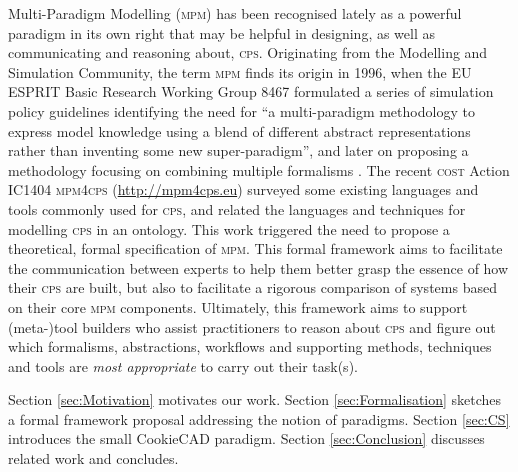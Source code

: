 Multi-Paradigm Modelling (\textsc{mpm}) has been recognised lately as a powerful
paradigm in its own right that may be helpful in designing, as well as
communicating and reasoning about, \textsc{cps}. Originating
from the Modelling and Simulation Community, the term \textsc{mpm} finds its origin
in 1996, when the EU ESPRIT Basic Research Working Group 8467 formulated a series of simulation
policy guidelines \cite{Vangheluwe-VansteenkisteKerckhoffs-1996} identifying the
need for ``a multi-paradigm methodology to express model knowledge using a blend
of different abstract representations rather than inventing some new
super-paradigm'', and later on proposing a methodology focusing on combining multiple 
formalisms \cite{Vangheluwe-Vansteenkiste1996}. 
The recent \textsc{cost} Action IC1404 \textsc{mpm4cps} (\url{http://mpm4cps.eu})
surveyed some existing languages and tools commonly used for \textsc{cps}, and 
related the languages and techniques for modelling \textsc{cps} in an ontology. 
This work triggered the need to propose a theoretical, formal specification of \textsc{mpm}. 
This formal framework aims to facilitate the communication between experts to help them 
better grasp the essence of how their \textsc{cps} are built, but also to facilitate a 
rigorous comparison of systems based on their core \textsc{mpm} components.
Ultimately, this framework aims to support (meta-)tool builders who assist
practitioners to reason about \textsc{cps} and figure out which formalisms,
abstractions, workflows and supporting methods, techniques and tools are
\emph{most appropriate} to carry out their task(s).


Section \ref{sec:Motivation} motivates our work.
Section \ref{sec:Formalisation} sketches a 
formal framework proposal addressing the notion of paradigms.
Section \ref{sec:CS} introduces the small CookieCAD paradigm. 
Section \ref{sec:Conclusion} discusses related work and concludes.

